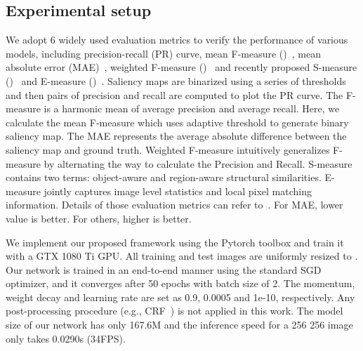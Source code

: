 \documentclass[runningheads]{llncs}
\begin{document}
\subsection{Experimental setup}
We adopt 6 widely used evaluation metrics to verify the performance of various models, including precision-recall (PR) curve, mean F-measure ()~\cite{Fmeasure}, mean absolute error (MAE)~\cite{Benchmark}, weighted F-measure ()~\cite{weightedF} and recently proposed S-measure ()~\cite{Smeasure} and E-measure ()~\cite{Emeasure}.
Saliency maps are binarized using a series of thresholds and then pairs of precision and recall are computed to plot the PR curve.
The F-measure is a harmonic mean of average precision and average recall.
Here, we calculate the mean F-measure which uses adaptive threshold to generate binary saliency map.
The MAE represents the average absolute difference between the saliency map and ground truth.
Weighted F-measure intuitively generalizes F-measure by alternating the way to calculate the Precision and Recall.
S-measure contains two terms: object-aware and region-aware structural similarities.
E-measure jointly captures image level statistics and local pixel matching information.
Details of those evaluation metrics can refer to~\cite{2DDeep}.
For MAE, lower value is better. For others, higher is better. 


We implement our proposed framework using the Pytorch toolbox and train it with a GTX 1080 Ti GPU.
All training and test images are uniformly resized to .
Our network is trained in an end-to-end manner using the standard SGD optimizer, and it converges after 50 epochs with batch size of 2.
The momentum, weight decay and learning rate are set as 0.9, 0.0005 and 1e-10, respectively.
Any post-processing procedure (e.g., CRF~\cite{CRF}) is not applied in this work.
The model size of our network has only 167.6M and the inference speed for a 256  256 image only takes 0.0290s (34FPS).
\end{document}
